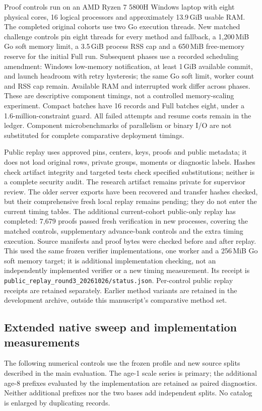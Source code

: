 Proof controls run on an AMD Ryzen 7 5800H Windows laptop with eight physical
cores, 16 logical processors and approximately 13.9\,GiB usable RAM.
The completed original cohorts use two Go execution threads. New matched
challenge controls pin eight threads for every method and fallback, a
1,200\,MiB Go soft memory limit, a 3.5\,GiB process RSS cap and a 650\,MiB
free-memory reserve for the initial Full run. Subsequent phases use a
recorded scheduling amendment: Windows low-memory notification, at least
1\,GiB available commit, and launch headroom with retry hysteresis; the
same Go soft limit, worker count and RSS cap remain. Available RAM and
interrupted work differ across phases. These are descriptive component
timings, not a controlled memory-scaling experiment. Compact batches have 16 records and Full batches eight,
under a 1.6-million-constraint guard. All failed attempts and resume costs
remain in the ledger. Component microbenchmarks of parallelism or binary I/O
are not substituted for complete comparative deployment timings.

Public replay uses approved pins, centers, keys, proofs and public metadata;
it does not load original rows, private groups, moments or diagnostic labels.
Hashes check artifact integrity and targeted tests check specified
substitutions; neither is a complete security audit. The research artifact
remains private for supervisor review. The older server exports have been
recovered and transfer hashes checked, but their comprehensive fresh local
replay remains pending; they do not enter the current timing tables. The
additional current-cohort public-only replay has completed: 7,679 proofs
passed fresh verification in new processes, covering the matched controls,
supplementary advance-bank controls and the extra timing execution. Source
manifests and proof bytes were checked before and after replay. This used the
same frozen verifier implementations, one worker and a 256\,MiB Go soft memory
target; it is additional implementation checking, not an independently
implemented verifier or a new timing measurement. Its receipt is
\texttt{public\_replay\_round3\_20261026/status.json}. Per-control public replay
receipts are retained separately.
Earlier method variants are retained
in the development archive, outside this manuscript's comparative method set.

\subsection{Extended native sweep and implementation measurements}
The following numerical controls use the frozen profile and new source
splits described in the main evaluation. The age-1 scale series is primary;
the additional age-8 prefixes evaluated by the implementation are retained
as paired diagnostics. Neither additional prefixes nor the two bases add
independent splits. No catalog is enlarged by duplicating records.




